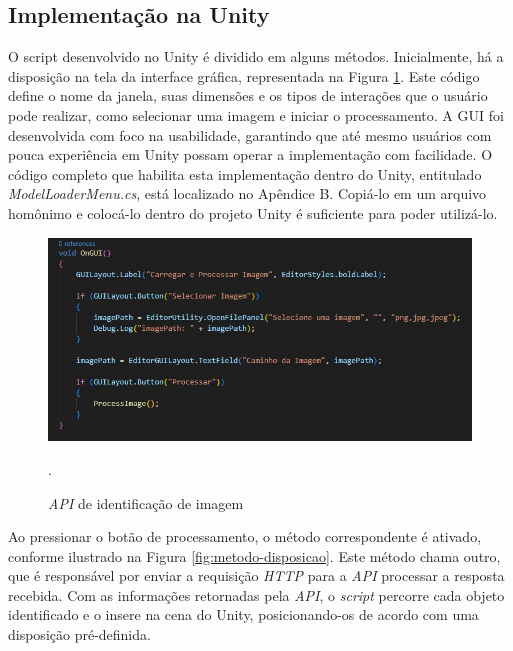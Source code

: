 \subsection{Implementação na Unity}

O script desenvolvido no Unity é dividido em alguns métodos. Inicialmente, há a disposição na tela da interface gráfica, representada na Figura \ref{fig:metodo-gui}. Este código define o nome da janela, suas dimensões e os tipos de interações que o usuário pode realizar, como selecionar uma imagem e iniciar o processamento. A GUI foi desenvolvida com foco na usabilidade, garantindo que até mesmo usuários com pouca experiência em Unity possam operar a implementação com facilidade. O código completo que habilita esta implementação dentro do Unity, entitulado \textit{ModelLoaderMenu.cs}, está localizado no Apêndice B. Copiá-lo em um arquivo homônimo e colocá-lo dentro do projeto Unity é suficiente para poder utilizá-lo.

\begin{figure}[!h]
    \centering
    \begin{minipage}{0.7\linewidth}
    \centering
    \captionsetup{justification=centering,margin=0.5cm,font=small}
    \includegraphics[width=1\linewidth]{img/cap5/gui-codigo.jpeg}
    \caption{\textit{API} de identificação de imagem}.
    \label{fig:metodo-gui}
    \end{minipage}
\end{figure}

Ao pressionar o botão de processamento, o método correspondente é ativado, conforme ilustrado na Figura \ref{fig:metodo-disposicao}. Este método chama outro, que é responsável por enviar a requisição \textit{HTTP} para a \textit{API} processar a resposta recebida. Com as informações retornadas pela \textit{API}, o \textit{script} percorre cada objeto identificado e o insere na cena do Unity, posicionando-os de acordo com uma disposição pré-definida. 

